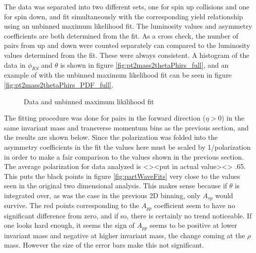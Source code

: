 \documentclass[abstract = on,listof=totoc, bibliography=totoc]{scrreprt}
\newcommand{\phirs}{\phi_{RS}}
\begin{document}
The data was separated into two different sets, one for spin up collisions and one for spin down, and fit simultaneously with the corresponding yield relationship using an unbinned maximum likelihood fit. The luminosity values and asymmetry coefficients are both determined from the fit. As a cross check, the number of pairs from up and down were counted separately can compared to the luminosity values determined from the fit. These were always consistent. A histogram of the data in $\phirs$ and $\theta$ is shown in figure \ref{fig:pt2mass2thetaPhirs_full}, and an example of with the unbinned maximum likelihood fit can be seen in figure \ref{fig:pt2mass2thetaPhirs_PDF_full}.
\begin{figure}[!tbp]
  \centering
  \hfill
  \caption{Data and unbinned maximum likilihood fit}
\end{figure}

The fitting procedure was done for pairs in the forward direction ($\eta > 0$) in the same invariant mass and transverse momentum bins as the previous section, and the results are shown below. Since the polarization was folded into the asymmetry coefficients in the fit the values here must be scaled by 1/polarization in order to make a fair comparison to the values shown in the previous section. The average polarization for data analyzed is <><put in actual value><> .65. This puts the black points in figure \ref{fig:partWaveFits} very close to the values seen in the original two dimensional analysis. This makes sense because if $\theta$ is integrated over, as was the case in the previous 2D binning, only $A_{sp}$ would survive. The red points corresponding to the $A_{pp}$ coefficient seem to have no significant difference from zero, and if so, there is certainly no trend noticeable. If one looks hard enough, it seems the sign of $A_{pp}$ seems to be positive at lower invariant mass and negative at higher invariant mass, the change coming at the $\rho$ mass. However the size of the error bars make this not significant. 
\end{document}
